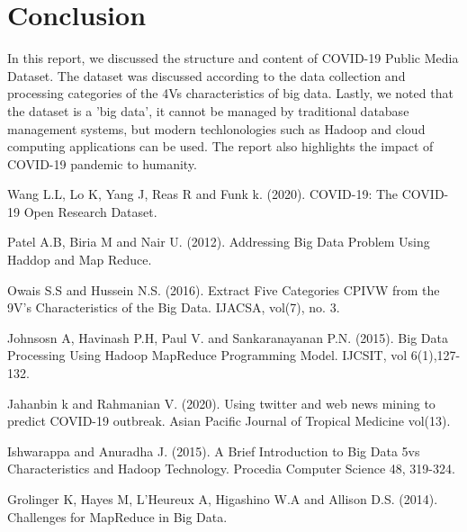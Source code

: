 \documentclass[11pt,twoside,conference]{IEEEtran}
\begin{document}
\section{Conclusion}
In this report, we discussed the structure and content of COVID-19 Public Media Dataset. The  dataset  was discussed according to the data  collection and processing categories of the 4Vs characteristics of big data. Lastly, we noted that the dataset is a 'big data', it cannot  be managed by traditional database management systems, but modern techlonologies such as Hadoop and cloud computing applications can be used. The report also highlights the impact of COVID-19 pandemic to humanity. 

\begin{thebibliography}{11}

Wang L.L, Lo K, Yang J, Reas R and Funk k. (2020). COVID-19: The COVID-19 Open Research Dataset.

Patel A.B, Biria M and Nair U. (2012). Addressing Big Data Problem Using Haddop and Map Reduce.

Owais S.S and Hussein N.S. (2016). Extract Five Categories CPIVW from the 9V's Characteristics of the Big Data. IJACSA, vol(7), no. 3.

Johnsosn A, Havinash P.H, Paul V. and Sankaranayanan P.N. (2015). Big Data Processing Using Hadoop MapReduce Programming Model. IJCSIT, vol 6(1),127-132.

Jahanbin k and Rahmanian V. (2020). Using twitter and web news mining to predict COVID-19 outbreak. Asian Pacific Journal of Tropical Medicine vol(13). 

Ishwarappa and Anuradha J. (2015). A Brief Introduction to Big Data 5vs Characteristics and Hadoop Technology. Procedia Computer Science 48, 319-324.

Grolinger K, Hayes M, L'Heureux A, Higashino W.A and Allison D.S. (2014). Challenges for MapReduce in Big Data.
\end{thebibliography}
\end{document}
